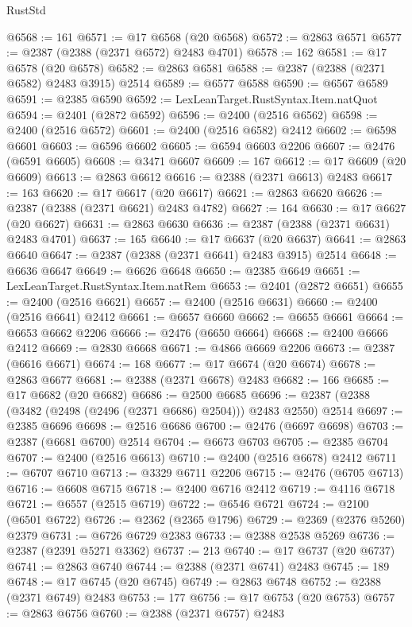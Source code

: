 \begin{lexlean}{RustStd}
\begin{coremodule}
@6568 := 161
@6571 := @17 @6568 (@20 @6568)
@6572 := @2863 @6571
@6577 := @2387 (@2388 (@2371 @6572) @2483 @4701)
@6578 := 162
@6581 := @17 @6578 (@20 @6578)
@6582 := @2863 @6581
@6588 := @2387 (@2388 (@2371 @6582) @2483 @3915) @2514
@6589 := @6577 @6588
@6590 := @6567 @6589
@6591 := @2385 @6590
@6592 := LexLeanTarget.RustSyntax.Item.natQuot
@6594 := @2401 (@2872 @6592)
@6596 := @2400 (@2516 @6562)
@6598 := @2400 (@2516 @6572)
@6601 := @2400 (@2516 @6582) @2412
@6602 := @6598 @6601
@6603 := @6596 @6602
@6605 := @6594 @6603 @2206
@6607 := @2476 (@6591 @6605)
@6608 := @3471 @6607
@6609 := 167
@6612 := @17 @6609 (@20 @6609)
@6613 := @2863 @6612
@6616 := @2388 (@2371 @6613) @2483
@6617 := 163
@6620 := @17 @6617 (@20 @6617)
@6621 := @2863 @6620
@6626 := @2387 (@2388 (@2371 @6621) @2483 @4782)
@6627 := 164
@6630 := @17 @6627 (@20 @6627)
@6631 := @2863 @6630
@6636 := @2387 (@2388 (@2371 @6631) @2483 @4701)
@6637 := 165
@6640 := @17 @6637 (@20 @6637)
@6641 := @2863 @6640
@6647 := @2387 (@2388 (@2371 @6641) @2483 @3915) @2514
@6648 := @6636 @6647
@6649 := @6626 @6648
@6650 := @2385 @6649
@6651 := LexLeanTarget.RustSyntax.Item.natRem
@6653 := @2401 (@2872 @6651)
@6655 := @2400 (@2516 @6621)
@6657 := @2400 (@2516 @6631)
@6660 := @2400 (@2516 @6641) @2412
@6661 := @6657 @6660
@6662 := @6655 @6661
@6664 := @6653 @6662 @2206
@6666 := @2476 (@6650 @6664)
@6668 := @2400 @6666 @2412
@6669 := @2830 @6668
@6671 := @4866 @6669 @2206
@6673 := @2387 (@6616 @6671)
@6674 := 168
@6677 := @17 @6674 (@20 @6674)
@6678 := @2863 @6677
@6681 := @2388 (@2371 @6678) @2483
@6682 := 166
@6685 := @17 @6682 (@20 @6682)
@6686 := @2500 @6685
@6696 := @2387 (@2388 (@3482 (@2498 (@2496 (@2371 @6686) @2504))) @2483 @2550) @2514
@6697 := @2385 @6696
@6698 := @2516 @6686
@6700 := @2476 (@6697 @6698)
@6703 := @2387 (@6681 @6700) @2514
@6704 := @6673 @6703
@6705 := @2385 @6704
@6707 := @2400 (@2516 @6613)
@6710 := @2400 (@2516 @6678) @2412
@6711 := @6707 @6710
@6713 := @3329 @6711 @2206
@6715 := @2476 (@6705 @6713)
@6716 := @6608 @6715
@6718 := @2400 @6716 @2412
@6719 := @4116 @6718
@6721 := @6557 (@2515 @6719)
@6722 := @6546 @6721
@6724 := @2100 (@6501 @6722)
@6726 := @2362 (@2365 @1796)
@6729 := @2369 (@2376 @5260) @2379
@6731 := @6726 @6729 @2383
@6733 := @2388 @2538 @5269
@6736 := @2387 (@2391 @5271 @3362)
@6737 := 213
@6740 := @17 @6737 (@20 @6737)
@6741 := @2863 @6740
@6744 := @2388 (@2371 @6741) @2483
@6745 := 189
@6748 := @17 @6745 (@20 @6745)
@6749 := @2863 @6748
@6752 := @2388 (@2371 @6749) @2483
@6753 := 177
@6756 := @17 @6753 (@20 @6753)
@6757 := @2863 @6756
@6760 := @2388 (@2371 @6757) @2483

\end{coremodule}
\end{lexlean}
